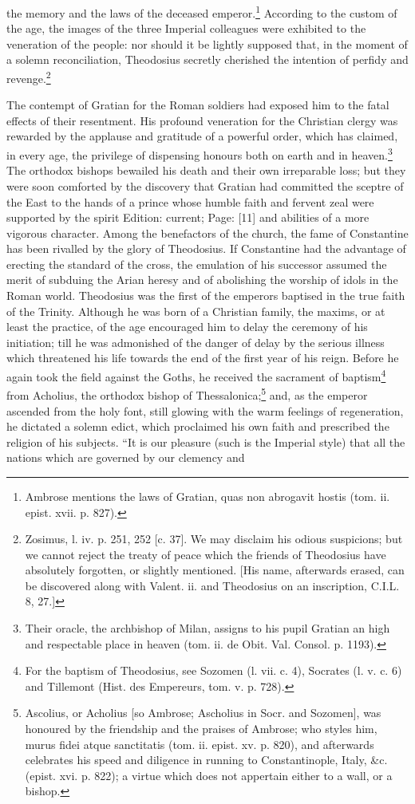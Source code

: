 the memory and the laws of the deceased emperor.\footnote{Ambrose mentions the laws of Gratian, quas non abrogavit hostis (tom. ii. epist. xvii. p. 827).} According to the custom of the age, the images of the three Imperial colleagues were exhibited to the veneration of the people: nor should it be lightly supposed that, in the moment of a solemn reconciliation, Theodosius secretly cherished the intention of perfidy and revenge.\footnote{Zosimus, l. iv. p. 251, 252 [c. 37]. We may disclaim his odious suspicions; but we cannot reject the treaty of peace which the friends of Theodosius have absolutely forgotten, or slightly mentioned. [His name, afterwards erased, can be discovered along with Valent. ii. and Theodosius on an inscription, C.I.L. 8, 27.]}

The contempt of Gratian for the Roman soldiers had exposed him to the fatal effects of their resentment. His profound veneration for the Christian clergy was rewarded by the applause and gratitude of a powerful order, which has claimed, in every age, the privilege of dispensing honours both on earth and in heaven.\footnote{Their oracle, the archbishop of Milan, assigns to his pupil Gratian an high and respectable place in heaven (tom. ii. de Obit. Val. Consol. p. 1193).} The orthodox bishops bewailed his death and their own irreparable loss; but they were soon comforted by the discovery that Gratian had committed the sceptre of the East to the hands of a prince whose humble faith and fervent zeal were supported by the spirit Edition: current; Page: [11] and abilities of a more vigorous character. Among the benefactors of the church, the fame of Constantine has been rivalled by the glory of Theodosius. If Constantine had the advantage of erecting the standard of the cross, the emulation of his successor assumed the merit of subduing the Arian heresy and of abolishing the worship of idols in the Roman world. Theodosius was the first of the emperors baptised in the true faith of the Trinity. Although he was born of a Christian family, the maxims, or at least the practice, of the age encouraged him to delay the ceremony of his initiation; till he was admonished of the danger of delay by the serious illness which threatened his life towards the end of the first year of his reign. Before he again took the field against the Goths, he received the sacrament of baptism\footnote{For the baptism of Theodosius, see Sozomen (l. vii. c. 4), Socrates (l. v. c. 6) and Tillemont (Hist. des Empereurs, tom. v. p. 728).} from Acholius, the orthodox bishop of Thessalonica;\footnote{Ascolius, or Acholius [so Ambrose; Ascholius in Socr. and Sozomen], was honoured by the friendship and the praises of Ambrose; who styles him, murus fidei atque sanctitatis (tom. ii. epist. xv. p. 820), and afterwards celebrates his speed and diligence in running to Constantinople, Italy, \&c. (epist. xvi. p. 822); a virtue which does not appertain either to a wall, or a bishop.} and, as the emperor ascended from the holy font, still glowing with the warm feelings of regeneration, he dictated a solemn edict, which proclaimed his own faith and prescribed the religion of his subjects. \texthebrew{“}It is our pleasure (such is the Imperial style) that all the nations which are governed by our clemency and 
